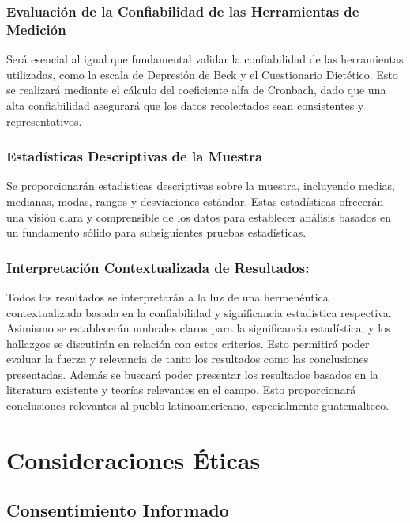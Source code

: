 \documentclass[jou]{apa7}
\begin{document}
	\subsubsection{Evaluación de la Confiabilidad de las Herramientas de Medición}
	Será esencial al igual que fundamental validar la confiabilidad de las herramientas utilizadas, como la escala de Depresión de Beck y el Cuestionario Dietético. Esto se realizará mediante el cálculo del coeficiente alfa de Cronbach, dado que una alta confiabilidad asegurará que los datos recolectados sean consistentes y representativos.
	
	\subsubsection{Estadísticas Descriptivas de la Muestra}
	Se proporcionarán estadísticas descriptivas sobre la muestra, incluyendo medias, medianas, modas, rangos y desviaciones estándar. Estas estadísticas ofrecerán una visión clara y comprensible de los datos para establecer análisis basados en un fundamento sólido para subsiguientes pruebas estadísticas.
	
	
	\subsubsection{Interpretación Contextualizada de Resultados:} Todos los
	resultados se interpretarán a la luz de una hermenéutica contextualizada
	basada en la confiabilidad y significancia estadística respectiva.
	Asimismo se establecerán umbrales claros para la significancia
	estadística, y los hallazgos se discutirán en relación con estos
	criterios. Esto permitirá poder evaluar la fuerza y relevancia de tanto
	los resultados como las conclusiones presentadas. Además se buscará
	poder presentar los resultados basados en la literatura existente y
	teorías relevantes en el campo. Esto proporcionará conclusiones
	relevantes al pueblo latinoamericano, especialmente guatemalteco.
	
	\section{Consideraciones Éticas}\label{consideraciones-uxe9ticas}
	
	\subsection{Consentimiento Informado}\label{consentimiento-informado}
	
\end{document}
